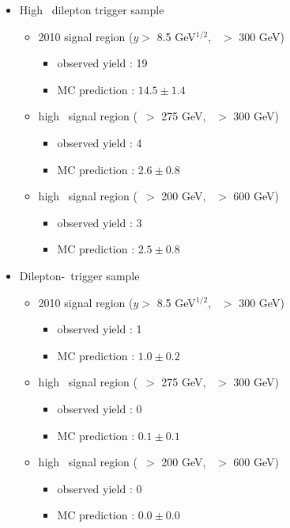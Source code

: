 \begin{itemize}
\item High \pt\ dilepton trigger sample
\begin{itemize}
\item 2010 signal region ($y >$ 8.5 GeV$^{1/2}$, \Ht\ $>$ 300 GeV)
   \begin{itemize} 
   \item observed yield : 19 
   \item MC prediction  : $14.5 \pm 1.4$
   \end{itemize}  
\item high \met\ signal region (\met\ $>$ 275 GeV, \Ht\ $>$ 300 GeV)
   \begin{itemize} 
   \item observed yield : 4 
   \item MC prediction  : $2.6 \pm 0.8$
   \end{itemize}  
\item high \Ht\ signal region (\met\ $>$ 200 GeV, \Ht\ $>$ 600 GeV)
   \begin{itemize} 
   \item observed yield : 3 
   \item MC prediction  : $2.5 \pm 0.8$
   \end{itemize}  
\end{itemize}

\item Dilepton-\Ht\ trigger sample
\begin{itemize}
\item 2010 signal region ($y >$ 8.5 GeV$^{1/2}$, \Ht\ $>$ 300 GeV)
   \begin{itemize} 
   \item observed yield : 1 
   \item MC prediction  : $1.0 \pm 0.2$
   \end{itemize}  
\item high \met\ signal region (\met\ $>$ 275 GeV, \Ht\ $>$ 300 GeV)
   \begin{itemize} 
   \item observed yield : 0 
   \item MC prediction  : $0.1 \pm 0.1$
   \end{itemize}  
\item high \Ht\ signal region (\met\ $>$ 200 GeV, \Ht\ $>$ 600 GeV)
   \begin{itemize} 
   \item observed yield : 0 
   \item MC prediction  : $0.0 \pm 0.0$
   \end{itemize}  
\end{itemize}
\end{itemize}

